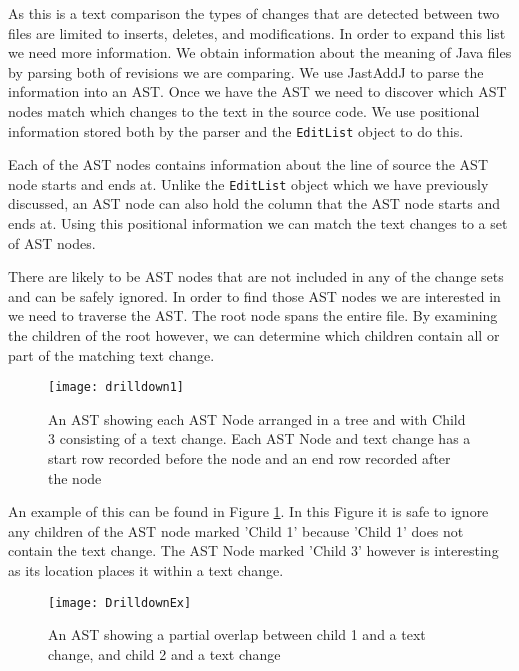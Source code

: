 As this is a text comparison the types of changes that are detected between two files are limited to inserts, deletes, and modifications. In order to expand this list we need more information.  We obtain information about the meaning of Java files by parsing both of revisions we are comparing.  We use JastAddJ \cite{Oqvist2013} to parse the information into an AST. Once we have the AST we need to discover which AST nodes match which changes to the text in the source code. We use positional information stored both by the parser and the \lstinline{EditList} object to do this.

\label{sec:over} 
Each of the AST nodes contains information about the line of source the AST node starts and ends at.  Unlike the \lstinline{EditList} object which we have previously discussed, an AST node can also hold the column that the AST node starts and ends at.  Using this positional information we can match the text changes to a set of AST nodes.

There are likely to be AST nodes that are not included in any of the change sets and can be safely ignored. In order to find those AST nodes we are interested in we need to traverse the AST.  The root node spans the entire file.  By examining the children of the root however, we can determine which children contain all or part of the matching text change.

\begin{figure}[!t]
 \begin{center}
  \texttt{[image: drilldown1]}
 \end{center}
 \caption{An AST showing each AST Node arranged in a tree and with Child 3 consisting of a text change.  Each AST Node and text change has a start row recorded before the node and an end row recorded after the node}
 \label{fig:findingASTNode}
\end{figure}

An example of this can be found in Figure \ref{fig:findingASTNode}.  In this Figure it is safe to ignore any children of the AST node marked 'Child 1' because 'Child 1' does not contain the text change.  The AST Node marked 'Child 3' however is interesting as its location places it within a text change. 


\begin{figure}[!t]
 \begin{center}
  \texttt{[image: DrilldownEx]}
 \end{center}
 \caption{An AST showing a partial overlap between child 1 and a text change, and child 2 and a text change}
 \label{fig:troubleASTNode}
\end{figure}

